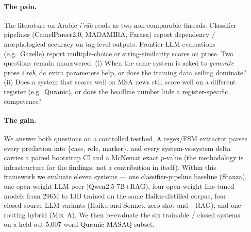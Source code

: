 \documentclass[10pt,a4paper,twocolumn]{article}
\newcommand{\irab}{\textit{i'r{\=a}b}}
\begin{document}
\paragraph{The pain.} The literature on Arabic \irab{} reads as two non-comparable threads. Classifier pipelines (CamelParser2.0, MADAMIRA, Farasa) report dependency / morphological accuracy on tag-level outputs. Frontier-LLM evaluations (e.g.\ Gazelle) report multiple-choice or string-similarity scores on prose. Two questions remain unanswered. (i) When the same system is asked to \emph{generate} prose \irab{}, do extra parameters help, or does the training data ceiling dominate? (ii) Does a system that scores well on MSA news still score well on a different register (e.g.\ Quranic), or does the headline number hide a register-specific competence?

\paragraph{The gain.} We answer both questions on a controlled testbed. A regex/FSM extractor parses every prediction into \{case, role, marker\}, and every system-vs-system delta carries a paired bootstrap CI and a McNemar exact $p$-value (the methodology is infrastructure for the findings, not a contribution in itself). Within this framework we evaluate eleven systems --- one classifier-pipeline baseline (Stanza), one open-weight LLM peer (Qwen2.5-7B+RAG), four open-weight fine-tuned models from 296M to 13B trained on the same Haiku-distilled corpus, four closed-source LLM variants (Haiku and Sonnet, zero-shot and $+$RAG), and one routing hybrid (Mix~A). We then re-evaluate the six trainable / closed systems on a held-out 5{,}007-word Quranic MASAQ subset.
\end{document}

